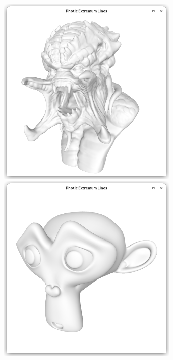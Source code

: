 \documentclass[9pt,fleqn,twoside,twocolumn]{stdglobal}
\begin{document}
\begin{figure}
\begin{subfigure}[t]{0.19\textwidth}
        \includegraphics[width=0.95\textwidth,trim={15px 15 15 50},clip]{images/results/predator.png}
        \includegraphics[width=0.95\textwidth,trim={15px 15 15 50},clip]{images/results/suzanne.png}

\end{subfigure}
\end{figure}
\end{document}
